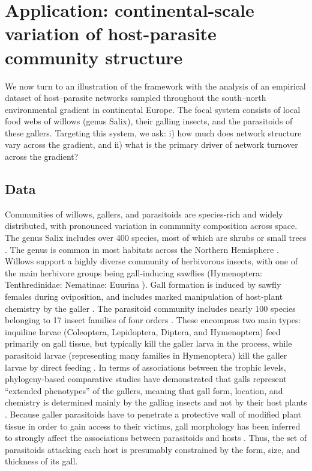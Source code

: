 \documentclass[12pt]{article}
\begin{document}

\section*{Application: continental-scale variation of host-parasite community structure}

We now turn to an illustration of the framework with the analysis of an
empirical dataset of host–parasite networks sampled throughout the south–north
environmental gradient in continental Europe. The focal system consists of local food webs
of willows (genus Salix), their galling insects, and the parasitoids of
these gallers. Targeting this system, we ask: i) how much does network
structure vary across the gradient, and ii) what is the primary driver of
network turnover across the gradient?

\subsection*{Data}  

Communities of willows, gallers, and parasitoids are species-rich and
widely distributed, with pronounced variation in community composition across
space. The genus Salix includes over 400 species, most of which are shrubs or
small trees \citep{Argus1997}. The genus is common in most habitats across the
Northern Hemisphere \citep{Skvortsov1999}. Willows support a highly diverse
community of herbivorous insects, with one of the main herbivore groups being
gall-inducing sawflies (Hymenoptera: Tenthredinidae: Nematinae: Euurina
\citep{Kopelke1999}). Gall formation is induced by sawfly females during
oviposition, and includes marked manipulation of host-plant chemistry by the
galler \citep{Nyman2000}. The parasitoid community includes nearly
100 species belonging to 17 insect families of four orders
\citep{Kopelke2000}. These encompass two main types: inquiline larvae
(Coleoptera, Lepidoptera, Diptera, and Hymenoptera) feed primarily on gall
tissue, but typically kill the galler larva in the process, while parasitoid
larvae (representing many families in Hymenoptera) kill the galler larvae by
direct feeding \citep{Kopelke2003}. In terms of associations between the
trophic levels, phylogeny-based comparative studies have demonstrated that
galls represent ``extended phenotypes'' of the gallers, meaning that gall form,
location, and chemistry is determined mainly by the galling insects and not by
their host plants \citep{Nyman2000}. Because galler parasitoids have to
penetrate a protective wall of modified plant tissue in order to gain access
to their victims, gall morphology has been inferred to strongly affect the
associations between parasitoids and hosts \citep{Nyman2007}. Thus, the set of
parasitoids attacking each host is presumably constrained by the form,
size, and thickness of its gall.
\end{document}
